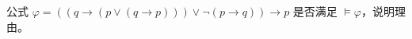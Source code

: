 公式 $\varphi=((q\rightarrow(p \vee(q \rightarrow p))) \vee \neg(p\rightarrow q)) \rightarrow p$ 
是否满足 $\models \varphi$，说明理由。